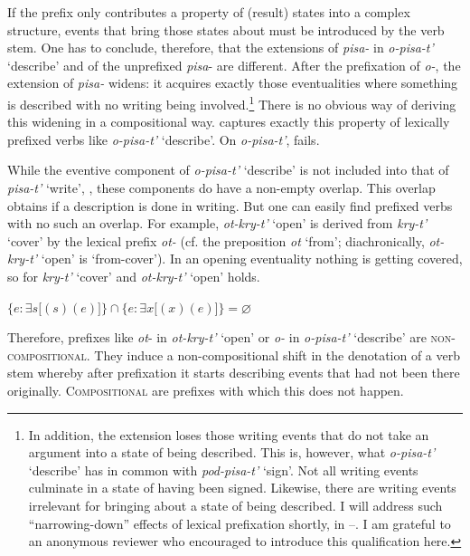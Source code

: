 \documentclass[output=paper,colorlinks,citecolor=brown]{langscibook}
\begin{document}
\noindent If the prefix only contributes a property of (result) states into a complex structure, events that bring those states about must be introduced by the verb stem. One has to conclude, therefore, that the extensions of \textit{pisa-} in \textit{o-pisa-t’} ‘describe’ and of the unprefixed \textit{pisa}- are different. After the prefixation of \textit{o-}, the extension of \textit{pisa-} widens: it acquires exactly those eventualities where something is described with no writing being involved.\footnote{\label{fn:30}In addition, the extension loses those writing events that do not take an argument into a state of being described. This is, however, what \textit{o-pisa-t’} ‘describe’ has in common with \textit{pod-pisa-t’} ‘sign’. Not all writing events culminate in a state of having been signed. Likewise, there are writing events irrelevant for bringing about a state of being described. I will address such “narrowing-down” effects of lexical prefixation shortly, in --. I am grateful to an anonymous reviewer who encouraged to introduce this qualification here.}  There is no obvious way of deriving this widening in a compositional way.  captures exactly this property of lexically prefixed verbs like \textit{o-pisa-t’} ‘describe’. On \textit{o-pisa-t’},  fails.

While the eventive component of \textit{o-pisa-t’} ‘describe’ is not included into that of \textit{pisa-t’} ‘write’, , these components do have a non-empty overlap. This overlap obtains if a description is done in writing. But one can easily find prefixed verbs with no such an overlap. For example, \textit{ot-kry-t’} ‘open’ is derived from \textit{kry-t’} ‘cover’ by the lexical prefix \textit{ot-} (cf. the preposition \textit{ot} ‘from’; diachronically, \textit{ot-kry-t’} ‘open’ is ‘from-cover’). In an opening eventuality nothing is getting covered, so for \textit{kry-t’} ‘cover’ and \textit{ot-kry-t’} ‘open’  holds.

\ea    $\{e: \exists s[$$(s)(e)]\} \cap \{e: \exists x[$$(x)(e)]\} = \varnothing$\label{ex:tatevosov:73}
\z

\noindent Therefore, prefixes like \textit{ot}- in \textit{ot-kry-t’} ‘open’ or \textit{o-} in \textit{o-pisa-t’} ‘describe’ are \textsc{non-compositional.} They induce a non-compositional shift in the denotation of a verb stem whereby after prefixation it starts describing events that had not been there originally. \textsc{Compositional} are prefixes with which this does not happen. 
\end{document}
